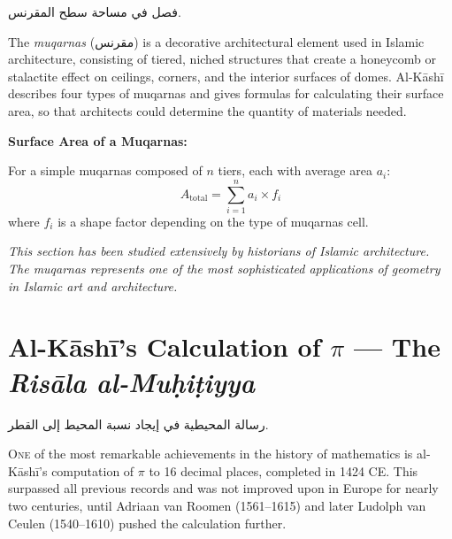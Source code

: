 \documentclass[11pt,a4paper]{article}
\newenvironment{arabicbox}{%
  \begin{framed}
  \begin{minipage}{\dimexpr\linewidth-2\fboxsep-2\fboxrule\relax}
  \setlength{\parindent}{0pt}
  \linespread{1.3}\selectfont
}{%
  \end{minipage}
  \end{framed}
}
\newenvironment{mathalgo}{%
  \par\vspace{0.3cm}
  \begin{framed}
  \setlength{\parindent}{0pt}
}{%
  \end{framed}
  \par\vspace{0.3cm}
}
\newcommand{\cnote}[1]{\textcolor{notecolor}{\textit{#1}}}
\newcommand{\ar}[1]{{\arabicfont\beginR #1\endR}}
\begin{document}
\begin{arabicbox}
\begin{Arabic}
فصل في مساحة سطح المقرنس.
\end{Arabic}
\end{arabicbox}

\vspace{0.3cm}

The \textit{muqarnas} (\ar{مقرنس}) is a decorative architectural
element used in Islamic architecture, consisting of tiered, niched
structures that create a honeycomb or stalactite effect on ceilings,
corners, and the interior surfaces of domes. Al-K\=ash\=i describes four
types of muqarnas and gives formulas for calculating their surface area,
so that architects could determine the quantity of materials needed.

\begin{mathalgo}
\textbf{Surface Area of a Muqarnas:}

For a simple muqarnas composed of $n$ tiers, each with average area
$a_i$:
\[
A_{\text{total}} = \sum_{i=1}^{n} a_i \times f_i
\]
where $f_i$ is a shape factor depending on the type of muqarnas cell.
\end{mathalgo}

\cnote{This section has been studied extensively by historians of
Islamic architecture. The muqarnas represents one of the most
sophisticated applications of geometry in Islamic art and architecture.}
\clearpage

\section{Al-K\=ash\=i's Calculation of $\pi$ --- The \textit{Ris\=ala al-Mu\d{h}i\d{t}iyya}}
\label{sec:picalc}

\begin{arabicbox}
\begin{Arabic}
رسالة المحيطية في إيجاد نسبة المحيط إلى القطر.
\end{Arabic}
\end{arabicbox}

\vspace{0.3cm}

\lettrine[lines=3, nindent=0em, findent=3pt]{\color{chapcolor}O}{ne}
of the most remarkable achievements in the history of mathematics is
al-K\=ash\=i's computation of $\pi$ to 16 decimal places, completed in 1424
CE. This surpassed all previous records and was not improved upon in
Europe for nearly two centuries, until Adriaan van Roomen (1561--1615)
and later Ludolph van Ceulen (1540--1610) pushed the calculation
further.
\end{document}
